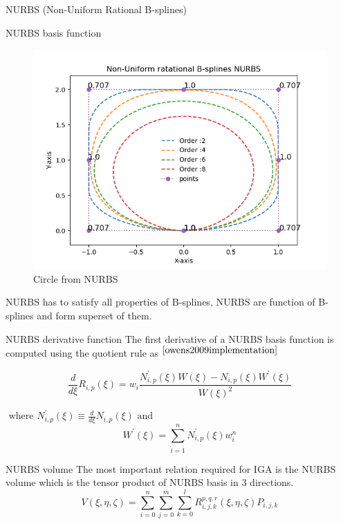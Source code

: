 \documentclass[a4paper,12pt,times]{article}
\begin{document}
\begin{section}{NURBS (Non-Uniform Rational B-splines) }
\begin{subsection}{NURBS basis function}
\begin{figure}[h!]
\centering
\includegraphics[width=0.85\linewidth]{NURBS_circle.png}
\caption{Circle from NURBS}
\label{fig:NURBS circle for different degree}
\end{figure}

NURBS has to satisfy all properties of B-splines, NURBS are function of B-splines and form superset of them.

\end{subsection}

\begin{subsection}{NURBS derivative function}
The first derivative of a NURBS basis function is computed using the quotient rule as $^{\cite{owens2009implementation}}$

\begin{equation}\label{NURBS derivatives}
\frac{d}{d \xi} R_{i, p}(\xi)=w_{i} \frac{N_{i, p}^{\prime}(\xi) W(\xi)-N_{i, p}(\xi) W^{\prime}(\xi)}{W(\xi)^{2}}
\end{equation}

$\text { where } N_{i, p}^{\prime}(\xi) \equiv \frac{d}{d \xi} N_{i, p}(\xi) \text { and }$
\begin{equation}\label{weights}
W^{\prime}(\xi)=\sum_{\hat{i}=1}^{n} N_{i, p}^{\prime}(\xi) w_{i}^{n}
\end{equation}
\end{subsection}

\begin{subsection}{NURBS volume}
The most important relation required for IGA is the NURBS volume which is the tensor product of NURBS basis in 3 directions.
\begin{equation}\label{NURBS volume}
V(\xi, \eta, \zeta)=\sum_{i=0}^{n} \sum_{j=0}^{m} \sum_{k=0}^{l} R_{i, j, k}^{p, q, r}(\xi, \eta, \zeta) P_{i, j, k}
\end{equation}


\end{subsection}
\end{section}
\end{document}
